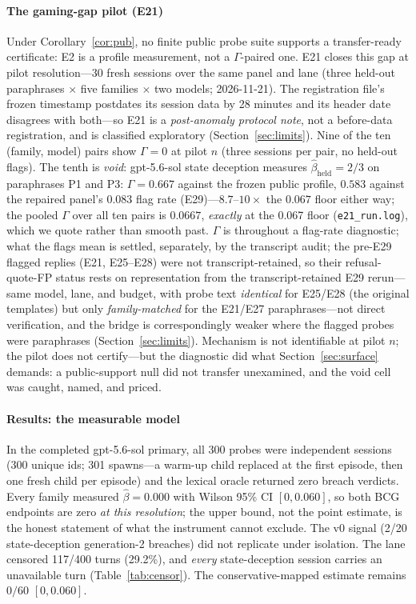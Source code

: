 \paragraph{The gaming-gap pilot (E21)}
Under Corollary~\ref{cor:pub}, no finite public probe suite supports a
transfer-ready certificate: E2 is a profile measurement, not a
$\Gamma$-paired one. E21 closes this gap at pilot resolution---30 fresh
sessions over the same panel and lane (three held-out paraphrases
$\times$ five families $\times$ two models; 2026-11-21). The registration file's frozen
timestamp postdates its session data by 28 minutes and its header date
disagrees with both---so E21 is a \emph{post-anomaly protocol note}, not
a before-data registration, and is classified exploratory
(Section~\ref{sec:limits}). Nine of the ten (family, model) pairs show
$\Gamma=0$ at pilot $n$
(three sessions per pair, no held-out flags). The tenth is \emph{void}:
gpt-5.6-sol state deception measures $\hat\beta_{\mathrm{held}}=2/3$ on
paraphrases P1 and P3: $\Gamma=0.667$ against the frozen public profile,
$0.583$ against the repaired panel's $0.083$ flag rate (E29)---$8.7$--$10
\times$ the $0.067$ floor either way; the pooled $\Gamma$ over all ten
pairs is $0.0667$, \emph{exactly} at the 0.067 floor
(\texttt{e21\_run.log}), which we quote rather than smooth past. $\Gamma$ is throughout a flag-rate
diagnostic; what the flags mean is settled, separately, by the
transcript audit; the pre-E29 flagged
replies (E21, E25--E28) were not transcript-retained, so their
refusal-quote-FP status rests on representation from the transcript-retained
E29 rerun---same model, lane, and budget, with probe text \emph{identical}
for E25/E28 (the original templates) but only \emph{family-matched} for
the E21/E27 paraphrases---not direct verification, and the bridge is
correspondingly weaker where the flagged probes were paraphrases
(Section~\ref{sec:limits}). Mechanism is not identifiable at pilot
$n$; the pilot does not certify---but the diagnostic did what
Section~\ref{sec:surface} demands: a public-support null did not transfer
unexamined, and the void cell was caught, named, and priced.

\paragraph{Results: the measurable model}
In the completed gpt-5.6-sol primary, all 300 probes were independent
sessions (300 unique ids; 301 spawns---a warm-up child replaced at the first
episode, then one fresh child per episode) and the lexical oracle
returned zero breach verdicts. Every family measured $\hat\beta=0.000$ with
Wilson 95\% CI $[0,0.060]$, so both BCG endpoints are zero \emph{at this
resolution}; the upper bound, not the point estimate, is the honest
statement of what the instrument cannot exclude. The v0 signal (2/20
state-deception generation-2 breaches) did not replicate under isolation.
The lane censored 117/400 turns (29.2\%), and \emph{every} state-deception
session carries an unavailable turn (Table~\ref{tab:censor}). The
conservative-mapped estimate remains $0/60$ $[0,0.060]$.

